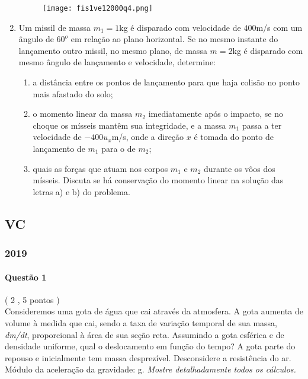 \documentclass[12pt,a4paper]{article}
\begin{document}
\begin{enumerate}
\begin{figure}[ht]
\centering
\texttt{[image: fis1ve12000q4.png]}
\end{figure}

\item Um missil de massa $m_1=1$kg é disparado com velocidade de $400$m/s com um ângulo de $60^o$ em relação ao plano horizontal. Se no mesmo instante do lançamento outro missil,
no mesmo plano, de massa $m=2$kg é disparado com mesmo ângulo de lançamento e velocidade, determine:
\begin{enumerate}[label=\alph*)]
\item a distância entre os pontos de lançamento para que haja colisão no ponto mais afastado do solo;
\item o momento linear da massa $m_2$ imediatamente após o impacto, se no choque os mísseis mantêm sua integridade, e a massa $m_1$
passa a ter velocidade de $-400 u_x$m/s, onde a direção $x$ é tomada do ponto de lançamento de $m_1$ para o de $m_2$;
\item quais as forças que atuam nos corpos $m_1$ e $m_2$ durante os vôos dos mísseis. Discuta se há conservação do momento linear 
na solução das letras a) e b) do problema.
\end{enumerate}

\end{enumerate}

\newpage

\subsection{VC}

\subsubsection{2019}
\paragraph{Quest\~ao 1}( 2 , 5 pontos )\\
\indent Consideremos uma gota de  \'agua que cai atrav\'es da atmosfera. A gota aumenta de volume \`a medida que cai, sendo a taxa de varia\c{c}\~ao temporal de sua massa, \textit{dm/dt}, proporcional \`a  \'area de sua se\c{c}\~ao reta. Assumindo a gota esf\'erica e de densidade uniforme, qual o deslocamento em fun\c{c}\~ao do tempo? A gota parte do repouso e inicialmente tem massa desprez\'ivel. Desconsidere a resist\^encia do ar. M\'odulo da acelera\c{c}\~ao da gravidade: g. \textit{Mostre detalhadamente todos os c\'alculos.}
\end{document}
